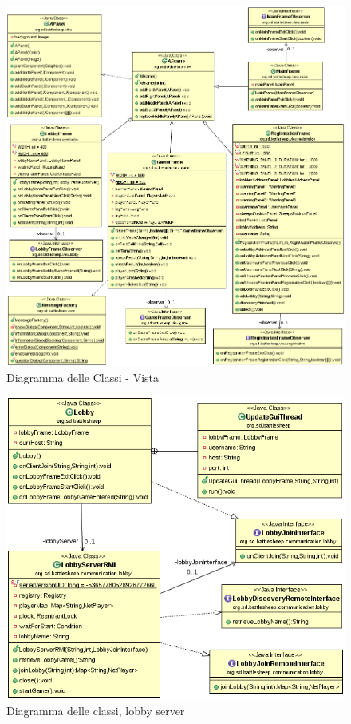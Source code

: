 \documentclass[a4paper,10pt]{scrartcl}
\begin{document}
\begin{figure}[!h]
	\centering
	\includegraphics[scale=0.4]{core/imgs/UML/VistaBellaUML.png}
	\caption{Diagramma delle Classi - Vista}
	\label{figure:class_diagram_view}
\end{figure}

\begin{figure}[!ht]
    \centering
\includegraphics[width=1.0\textwidth]{core/imgs/UML/LobbyCommunicationUML.png}
    \caption{Diagramma delle classi, lobby server}
    \label{fig:classlobby}
\end{figure}
\end{document}
